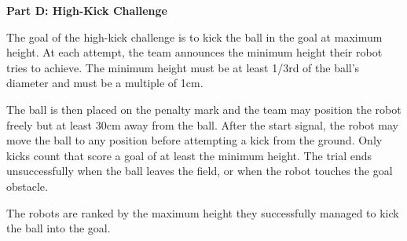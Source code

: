 \clearpage
\sffamily
{\bfseries\color[rgb]{0.4,0.4,0.4} Part D: High-Kick Challenge}

\bigskip

The goal of the high-kick challenge is to kick the ball in the goal at maximum height. At each attempt, the team announces the minimum height their robot tries to achieve. The minimum height must be at least 1/3rd of the ball's diameter and must be a multiple of 1cm.

The ball is then placed on the penalty mark and the team may position the robot freely but at least 30cm away from the ball. After the start signal, the robot may move the ball to any position before attempting a kick from the ground. Only kicks count that score a goal of at least the minimum height. The trial ends unsuccessfully when the ball leaves
the field, or when the robot touches the goal obstacle.

The robots are ranked by the maximum height they successfully managed to kick the ball into the goal.